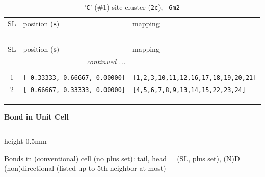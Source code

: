 \documentclass[fleqn,10pt,landscape]{jsarticle}
\begin{document}
\renewcommand{\arraystretch}{1.6}
\begin{longtable}[l]{cll}
\captionsetup{justification=raggedright, singlelinecheck=off}
\caption{'\texttt{C}' (\#1) site cluster (\texttt{2c}), \texttt{-6m2}}
 \\
 \hline \hline
SL & position ($\bm{s})$ & mapping \\ \hline \endfirsthead

\multicolumn{2}{l}{\tablename\ \thetable{}} \\
 \hline \hline
SL & position ($\bm{s})$ & mapping \\ \hline \endhead

 \hline \hline
\multicolumn{2}{r}{\footnotesize\it continued ...} \\ \endfoot

 \hline \hline
\multicolumn{2}{r}{} \\ \endlastfoot

1 & \texttt{[ 0.33333, 0.66667, 0.00000]} & \texttt{[1,2,3,10,11,12,16,17,18,19,20,21]} \\ \hline
2 & \texttt{[ 0.66667, 0.33333, 0.00000]} & \texttt{[4,5,6,7,8,9,13,14,15,22,23,24]} \\
\end{longtable}
\vspace{5mm}
\noindent \rule[0.5mm]{5mm}{0.5mm}\hspace{3mm}\textbf{Bond in Unit Cell}\hspace{3mm}\leaders\hrule height 0.5mm\hfill\kern0pt
\vspace{3mm}

\noindent Bonds in (conventional) cell (no plus set): tail, head = (SL, plus set), (N)D = (non)directional (listed up to 5th neighbor at most)
\end{document}
